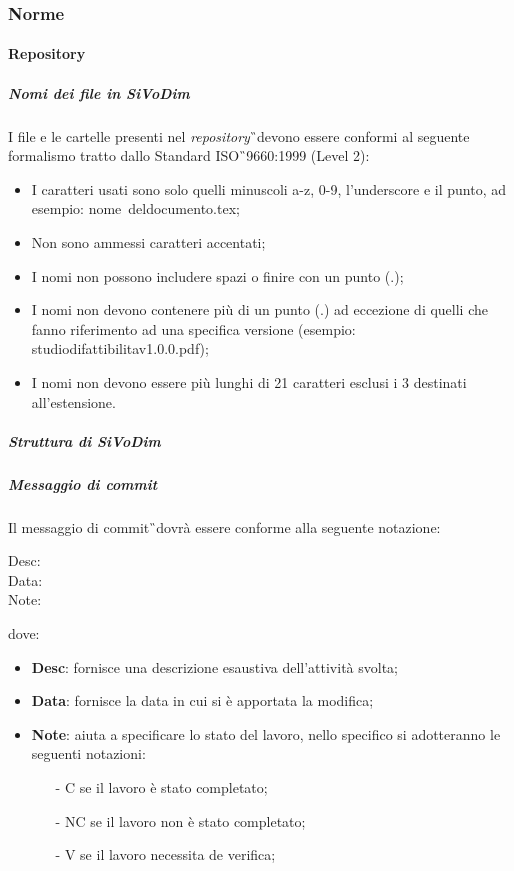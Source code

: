 \subsubsection{Norme}
\paragraph{Repository}
\subparagraph{Nomi dei file in SiVoDim} I file e le cartelle presenti
nel \textit{repository}\G\ devono essere conformi al seguente formalismo tratto dallo Standard
ISO\G\ 9660:1999 (Level 2):
\begin{itemize}
\item I caratteri usati sono solo quelli minuscoli a-z, 0-9, l’underscore e il punto, ad esempio: nome\textunderscore\ del\textunderscore documento.tex;
\item Non sono ammessi caratteri accentati;
\item I nomi non possono includere spazi o finire con un punto (.);
\item I nomi non devono contenere più di un punto (.) ad eccezione di quelli che fanno riferimento ad una specifica versione (esempio: studio\textunderscore di\textunderscore fattibilita\textunderscore v1.0.0.pdf);
\item I nomi non devono essere più lunghi di 21 caratteri esclusi i 3 destinati all’estensione.
\end{itemize}

\subparagraph{Struttura di SiVoDim}

\subparagraph{Messaggio di commit} Il messaggio di commit\G\ dovrà
essere conforme alla seguente notazione:
\begin{center}
Desc:\\
Data:\\
Note:\\
\end{center}
dove:
\begin{itemize}
\item \textbf{Desc}: fornisce una descrizione esaustiva dell’attività svolta;
\item \textbf{Data}: fornisce la data in cui si è apportata la modifica;
\item \textbf{Note}: aiuta a specificare lo stato del lavoro, nello specifico si adotteranno le seguenti notazioni:
\begin{itemize}
\item [-]{C} se il lavoro è stato completato;
\item [-]{NC} se il lavoro non è stato completato;
\item [-]{V} se il lavoro necessita de verifica;
\end{itemize}
\end{itemize}

